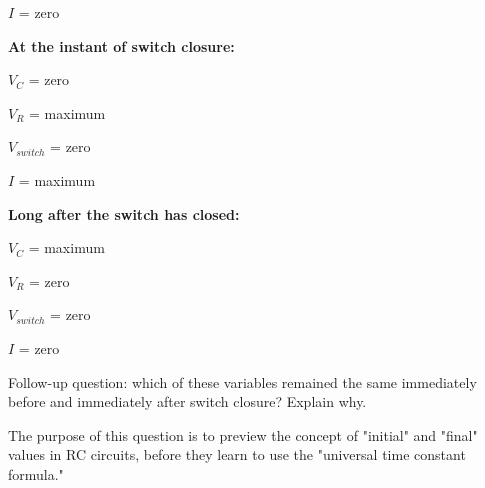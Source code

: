 $I$ = zero

\vskip 10pt
\goodbreak

\noindent
{\bf At the instant of switch closure:}

$V_{C}$ = zero

$V_{R}$ = maximum

$V_{switch}$ = zero

$I$ = maximum

\vskip 10pt
\goodbreak

\noindent
{\bf Long after the switch has closed:}

$V_{C}$ = maximum

$V_{R}$ = zero

$V_{switch}$ = zero

$I$ = zero

\vskip 10pt

Follow-up question: which of these variables remained the same immediately before and immediately after switch closure?  Explain why.







The purpose of this question is to preview the concept of "initial" and "final" values in RC circuits, before they learn to use the "universal time constant formula."




